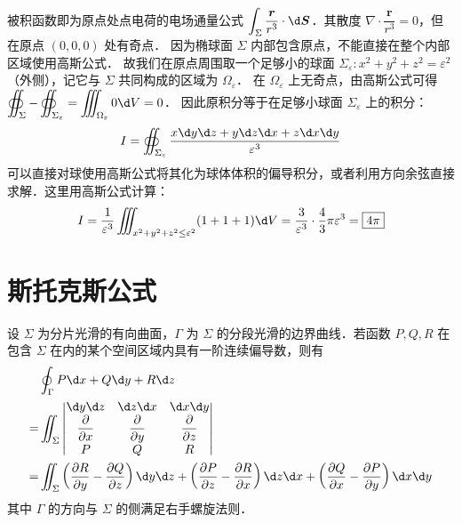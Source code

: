 \documentclass[12pt, a4paper, oneside, UTF8]{ctexbook}
\begin{document}
\begin{solution}
    被积函数即为原点处点电荷的电场通量公式 $\displaystyle\int_\Sigma \frac{\bm{r}}{r^3} \cdot \d \bm{S}$．其散度 $\nabla \cdot \dfrac{\bm{r}}{r^3} = 0$，但在原点 $(0,0,0)$ 处有奇点．
    因为椭球面 $\Sigma$ 内部包含原点，不能直接在整个内部区域使用高斯公式．
    故我们在原点周围取一个足够小的球面 $\Sigma_{\varepsilon}: x^2+y^2+z^2=\varepsilon^2$ （外侧），记它与 $\Sigma$ 共同构成的区域为 $\Omega_{\varepsilon}$．
    在 $\Omega_{\varepsilon}$ 上无奇点，由高斯公式可得 $\displaystyle\oiint_{\Sigma} - \oiint_{\Sigma_{\varepsilon}} = \iiint_{\Omega_{\varepsilon}} 0 \d V = 0$．
    因此原积分等于在足够小球面 $\Sigma_{\varepsilon}$ 上的积分：
    \[ I = \oiint_{\Sigma_{\varepsilon}} \frac{x\d y\d z+y\d z\d x+z\d x\d y}{\varepsilon^3} \]
    可以直接对球使用高斯公式将其化为球体体积的偏导积分，或者利用方向余弦直接求解．这里用高斯公式计算：
    \[ I = \frac{1}{\varepsilon^3} \iiint_{x^2+y^2+z^2 \le \varepsilon^2} (1+1+1) \d V = \frac{3}{\varepsilon^3} \cdot \frac{4}{3}\pi\varepsilon^3 = \boxed{4\pi} \]
\end{solution}
\section{斯托克斯公式}
\begin{theorem}
    设 $\Sigma$ 为分片光滑的有向曲面，$\Gamma$ 为 $\Sigma$ 的分段光滑的边界曲线．若函数 $P, Q, R$ 在包含 $\Sigma$ 在内的某个空间区域内具有一阶连续偏导数，则有
    \begin{align*}&\oint_\Gamma P \d x + Q \d y + R \d z \\
        =& \iint_\Sigma \begin{vmatrix} \d y \d z & \d z \d x & \d x \d y \\ \dfrac{\partial}{\partial x} & \dfrac{\partial}{\partial y} & \dfrac{\partial}{\partial z} \\ P & Q & R \end{vmatrix}\\ 
        =& \iint_\Sigma \left( \frac{\partial R}{\partial y} - \frac{\partial Q}{\partial z} \right) \d y \d z + \left( \frac{\partial P}{\partial z} - \frac{\partial R}{\partial x} \right) \d z \d x + \left( \frac{\partial Q}{\partial x} - \frac{\partial P}{\partial y} \right) \d x \d y 
    \end{align*}
    其中 $\Gamma$ 的方向与 $\Sigma$ 的侧满足右手螺旋法则．
\end{theorem}
\end{document}
